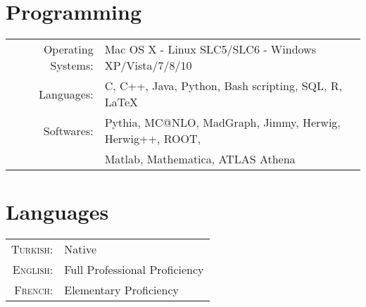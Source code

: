 \documentclass[a4paper,10pt]{article}
\begin{document}
\vspace{3mm}
\section{Programming}
\begin{tabular}{rl}
Operating Systems: 	& Mac OS X - Linux SLC5/SLC6 - Windows XP/Vista/7/8/10 	\\
Languages: 		& C, C++, Java, Python, Bash scripting, SQL, R, \LaTeX				\\
Softwares: 		& Pythia, MC@NLO, MadGraph, Jimmy, Herwig, Herwig++, ROOT,		\\
				& Matlab, Mathematica, ATLAS Athena 							\\
\end{tabular}

\vspace{3mm}
\section{Languages}

\begin{tabular}{rl}
\textsc{Turkish:}	& Native					\\
\textsc{English:}	& Full Professional Proficiency	\\
\textsc{French:}		& Elementary Proficiency		\\
\end{tabular}
\end{document}
